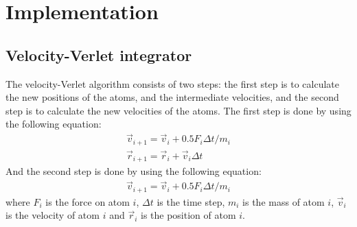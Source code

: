 \chapter{Implementation}\label{chap:Implementation}

\section{Velocity-Verlet integrator}

    The velocity-Verlet algorithm consists of two steps: the first step is to calculate the new positions of the atoms, and the intermediate velocities, and the second step is to calculate the new velocities of the atoms. The first step is done by using the following equation:
    \begin{equation}
    \label{eq:verlet1}
        \begin{aligned}
        \vec{v}_{i+1}= \vec{v}_{i} + 0.5 F_{i} \Delta t / m_{i} \\
        \vec{r}_{i+1} = \vec{r}_i + \vec{v}_i \Delta t
        \end{aligned}
    \end{equation}
    And the second step is done by using the following equation:
    \begin{equation}
    \label{eq:verlet2}
        \begin{aligned}
        \vec{v}_{i+1}= \vec{v}_{i} + 0.5 F_{i} \Delta t / m_{i}
        \end{aligned}
    \end{equation}
    where $F_{i}$ is the force on atom $i$, $\Delta t$ is the time step, $m_{i}$ is the mass of atom $i$, $\vec{v}_{i}$ is the velocity of atom $i$ and $\vec{r}_{i}$ is the position of atom $i$. 


